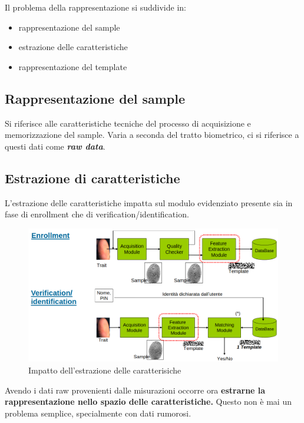 \noindent Il problema della rappresentazione si suddivide in:
\begin{itemize}
    \item rappresentazione del sample
    \item estrazione delle caratteristiche
    \item rappresentazione del template
\end{itemize}

\subsection{Rappresentazione del sample}

Si riferisce alle caratteristiche tecniche del processo di acquisizione e memorizzazione del sample.
Varia a seconda del tratto biometrico, ci si riferisce a questi dati come \textbf{\textit{raw data}}.

\subsection{Estrazione di caratteristiche}

L'estrazione delle caratteristiche impatta sul modulo evidenziato
presente sia in fase di enrollment che di verification/identification.

\begin{figure}[ht]
    \centering
    \includegraphics[width=1\linewidth]{chapters/images-chap2/estrazione.png}
    \caption{Impatto dell'estrazione delle caratterisiche}
\end{figure}

Avendo i dati raw provenienti dalle misurazioni occorre ora \textbf{estrarne la rappresentazione nello spazio delle caratteristiche.}
Questo non è mai un problema semplice, specialmente con dati rumorosi.

